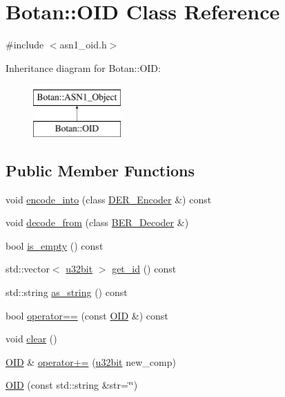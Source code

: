 \hypertarget{classBotan_1_1OID}{\section{Botan\-:\-:O\-I\-D Class Reference}
\label{classBotan_1_1OID}
}


{\ttfamily \#include $<$asn1\-\_\-oid.\-h$>$}

Inheritance diagram for Botan\-:\-:O\-I\-D\-:\begin{figure}[H]
\begin{center}
\leavevmode
\includegraphics[height=2.000000cm]{classBotan_1_1OID}
\end{center}
\end{figure}
\subsection*{Public Member Functions}
\begin{DoxyCompactItemize}
\item 
void \hyperlink{classBotan_1_1OID_a8005ba9980d6ae55cb52855e2337eab0}{encode\-\_\-into} (class \hyperlink{classBotan_1_1DER__Encoder}{D\-E\-R\-\_\-\-Encoder} \&) const 
\item 
void \hyperlink{classBotan_1_1OID_a4a22280de830831c14bf146a0200e3bd}{decode\-\_\-from} (class \hyperlink{classBotan_1_1BER__Decoder}{B\-E\-R\-\_\-\-Decoder} \&)
\item 
bool \hyperlink{classBotan_1_1OID_aa92086f50c1a738fc2090c8135078f7f}{is\-\_\-empty} () const 
\item 
std\-::vector$<$ \hyperlink{namespaceBotan_aacc7d03c95e97e76168fc1c819031830}{u32bit} $>$ \hyperlink{classBotan_1_1OID_a16199447a7d99487f4cf7ca2f444b9b0}{get\-\_\-id} () const 
\item 
std\-::string \hyperlink{classBotan_1_1OID_a07817e61723bd45f103663cb1922676f}{as\-\_\-string} () const 
\item 
bool \hyperlink{classBotan_1_1OID_a33cacf5540c3dfd53f319d9f3c88893a}{operator==} (const \hyperlink{classBotan_1_1OID}{O\-I\-D} \&) const 
\item 
void \hyperlink{classBotan_1_1OID_acb40e3bf797139be9753fdc83d84c362}{clear} ()
\item 
\hyperlink{classBotan_1_1OID}{O\-I\-D} \& \hyperlink{classBotan_1_1OID_acc0c690698cd2bcadf044749001d5f23}{operator+=} (\hyperlink{namespaceBotan_aacc7d03c95e97e76168fc1c819031830}{u32bit} new\-\_\-comp)
\item 
\hyperlink{classBotan_1_1OID_aefca0a62c145266b0b7d05a485b6c793}{O\-I\-D} (const std\-::string \&str=\char`\"{}\char`\"{})
\end{DoxyCompactItemize}



